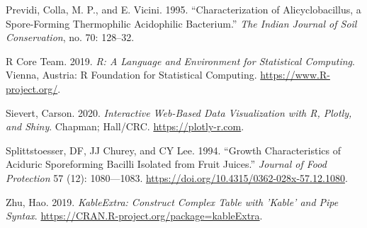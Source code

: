 \documentclass[
  12pt,
]{article}
\begin{document}
\leavevmode\hypertarget{ref-previdi}{}%
Previdi, Colla, M. P., and E. Vicini. 1995. ``Characterization of
Alicyclobacillus, a Spore-Forming Thermophilic Acidophilic Bacterium.''
\emph{The Indian Journal of Soil Conservation}, no. 70: 128--32.

\leavevmode\hypertarget{ref-r}{}%
R Core Team. 2019. \emph{R: A Language and Environment for Statistical
Computing}. Vienna, Austria: R Foundation for Statistical Computing.
\url{https://www.R-project.org/}.

\leavevmode\hypertarget{ref-plotly}{}%
Sievert, Carson. 2020. \emph{Interactive Web-Based Data Visualization
with R, Plotly, and Shiny}. Chapman; Hall/CRC.
\url{https://plotly-r.com}.

\leavevmode\hypertarget{ref-splittstoesser}{}%
Splittstoesser, DF, JJ Churey, and CY Lee. 1994. ``Growth
Characteristics of Aciduric Sporeforming Bacilli Isolated from Fruit
Juices.'' \emph{Journal of Food Protection} 57 (12): 1080---1083.
\url{https://doi.org/10.4315/0362-028x-57.12.1080}.

\leavevmode\hypertarget{ref-kableExtra}{}%
Zhu, Hao. 2019. \emph{KableExtra: Construct Complex Table with 'Kable'
and Pipe Syntax}. \url{https://CRAN.R-project.org/package=kableExtra}.
\end{document}

